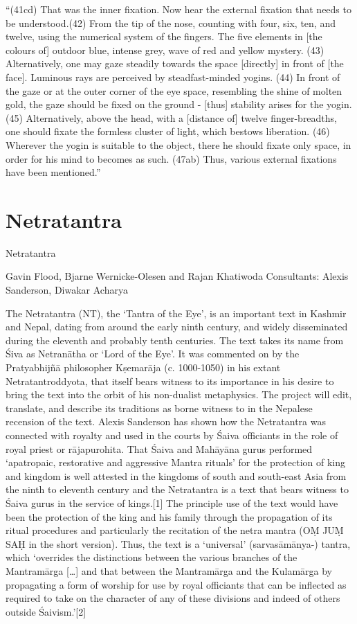 ``(41cd) That was the inner fixation. Now hear the external fixation that needs to be understood.(42) From the tip of the nose, counting with four, six, ten, and twelve, using the numerical system of the fingers. The five elements in [the colours of] outdoor blue, intense grey, wave of red and yellow mystery. (43) Alternatively, one may gaze steadily towards the space [directly] in front of [the face]. Luminous rays are perceived by steadfast-minded yogins. (44) In front of the gaze or at the outer corner of the eye space, resembling the shine of molten gold, the gaze should be fixed on the ground - [thus] stability arises for the yogin. (45) Alternatively, above the head, with a [distance of] twelve finger-breadths, one should fixate the formless cluster of light, which bestows liberation. (46) Wherever the yogin is suitable to the object, there he should fixate only space, in order for his mind to becomes as such. (47ab) Thus, various external fixations have been mentioned.''

\section{Netratantra}

Netratantra

Gavin Flood, Bjarne Wernicke-Olesen and Rajan Khatiwoda
Consultants: Alexis Sanderson, Diwakar Acharya

The Netratantra (NT), the ‘Tantra of the Eye’, is an important text in Kashmir and Nepal, dating from around the early ninth century, and widely disseminated during the eleventh and probably tenth centuries. The text takes its name from Śiva as Netranātha or ‘Lord of the Eye’. It was commented on by the Pratyabhijñā philosopher Kṣemarāja (c. 1000-1050) in his extant Netratantroddyota, that itself bears witness to its importance in his desire to bring the text into the orbit of his non-dualist metaphysics. The project will edit, translate, and describe its traditions as borne witness to in the Nepalese recension of the text. Alexis Sanderson has shown how the Netratantra was connected with royalty and used in the courts by Śaiva officiants in the role of royal priest or rājapurohita. That Śaiva and Mahāyāna gurus performed ‘apatropaic, restorative and aggressive Mantra rituals’ for the protection of king and kingdom is well attested in the kingdoms of south and south-east Asia from the ninth to eleventh century and the Netratantra is a text that bears witness to Śaiva gurus in the service of kings.[1] The principle use of the text would have been the protection of the king and his family through the propagation of its ritual procedures and particularly the recitation of the netra mantra (OṂ JUṂ SAḤ in the short version). Thus, the text is a ‘universal’ (sarvasāmānya-) tantra, which ‘overrides the distinctions between the various branches of the Mantramārga […] and that between the Mantramārga and the Kulamārga by propagating a form of worship for use by royal officiants that can be inflected as required to take on the character of any of these divisions and indeed of others outside Śaivism.’[2]

